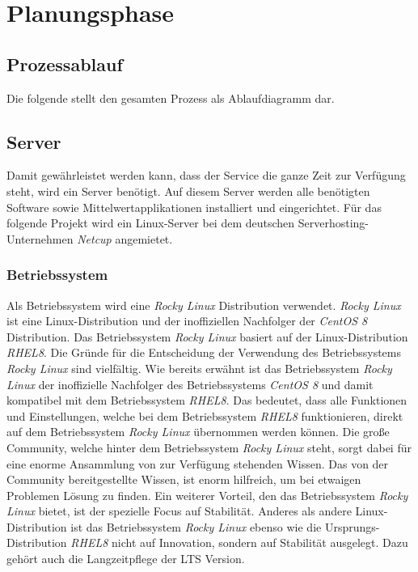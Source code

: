 \chapter{Planungsphase}

\section{Prozessablauf}

Die folgende  stellt den gesamten Prozess als Ablaufdiagramm dar.


\section{Server}
Damit gewährleistet werden kann, dass der Service die ganze Zeit zur Verfügung steht, wird ein Server benötigt.
Auf diesem Server werden alle benötigten Software sowie Mittelwertapplikationen installiert und eingerichtet.
Für das folgende Projekt wird ein Linux-Server bei dem deutschen Serverhosting-Unternehmen \textit{Netcup} angemietet.

\subsection{Betriebssystem}
Als Betriebssystem wird eine \textit{Rocky Linux} Distribution verwendet.
\textit{Rocky Linux} ist eine Linux-Distribution und der inoffiziellen Nachfolger der \textit{CentOS 8} Distribution.
Das Betriebssystem \textit{Rocky Linux} basiert auf der Linux-Distribution \textit{\ac{RHEL8}}.
Die Gründe für die Entscheidung der Verwendung des Betriebssystems \textit{Rocky Linux} sind vielfältig.
Wie bereits erwähnt ist das Betriebssystem \textit{Rocky Linux} der inoffizielle Nachfolger des Betriebssystems \textit{CentOS 8} und damit kompatibel mit dem Betriebssystem \textit{\ac{RHEL8}}.
Das bedeutet, dass alle Funktionen und Einstellungen, welche bei dem Betriebssystem \textit{\ac{RHEL8}} funktionieren, direkt auf dem Betriebssystem \textit{Rocky Linux} übernommen werden können.
Die große Community, welche hinter dem Betriebssystem \textit{Rocky Linux} steht, sorgt dabei für eine enorme Ansammlung von zur Verfügung stehenden Wissen.
Das von der Community bereitgestellte Wissen, ist enorm hilfreich, um bei etwaigen Problemen Lösung zu finden.
Ein weiterer Vorteil, den das Betriebssystem \textit{Rocky Linux} bietet, ist der spezielle Focus auf Stabilität.
Anderes als andere Linux-Distribution ist das Betriebssystem \textit{Rocky Linux} ebenso wie die Ursprungs-Distribution \textit{\ac{RHEL8}} nicht auf Innovation, sondern auf Stabilität ausgelegt.
Dazu gehört auch die Langzeitpflege der \ac{LTS} Version.

